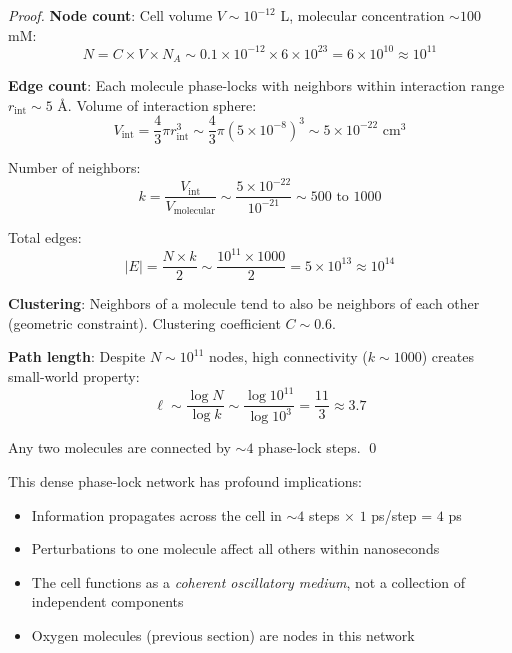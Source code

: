 \begin{proof}
\textbf{Node count}: Cell volume $V \sim 10^{-12}$ L, molecular concentration $\sim 100$ mM:
\begin{equation}
N = C \times V \times N_A \sim 0.1 \times 10^{-12} \times 6 \times 10^{23} = 6 \times 10^{10} \approx 10^{11}
\end{equation}

\textbf{Edge count}: Each molecule phase-locks with neighbors within interaction range $r_{\text{int}} \sim 5$ Å. Volume of interaction sphere:
\begin{equation}
V_{\text{int}} = \frac{4}{3} \pi r_{\text{int}}^3 \sim \frac{4}{3} \pi (5 \times 10^{-8})^3 \sim 5 \times 10^{-22} \text{ cm}^3
\end{equation}

Number of neighbors:
\begin{equation}
k = \frac{V_{\text{int}}}{V_{\text{molecular}}} \sim \frac{5 \times 10^{-22}}{10^{-21}} \sim 500 \text{ to } 1000
\end{equation}

Total edges:
\begin{equation}
|E| = \frac{N \times k}{2} \sim \frac{10^{11} \times 1000}{2} = 5 \times 10^{13} \approx 10^{14}
\end{equation}

\textbf{Clustering}: Neighbors of a molecule tend to also be neighbors of each other (geometric constraint). Clustering coefficient $C \sim 0.6$.

\textbf{Path length}: Despite $N \sim 10^{11}$ nodes, high connectivity ($k \sim 1000$) creates small-world property:
\begin{equation}
\ell \sim \frac{\log N}{\log k} \sim \frac{\log 10^{11}}{\log 10^3} = \frac{11}{3} \approx 3.7
\end{equation}

Any two molecules are connected by $\sim 4$ phase-lock steps. \qed
\end{proof}

\begin{remark}
This dense phase-lock network has profound implications:
\begin{itemize}
\item Information propagates across the cell in $\sim 4$ steps × $1$ ps/step = $4$ ps
\item Perturbations to one molecule affect all others within nanoseconds
\item The cell functions as a \textit{coherent oscillatory medium}, not a collection of independent components
\item Oxygen molecules (previous section) are nodes in this network
\end{itemize}
\end{remark}

